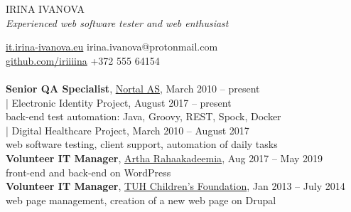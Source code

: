 \documentclass[a4paper, 12pt]{article}
\begin{document}
\begin{center}
  {\LARGE{IRINA IVANOVA}}\\
  \textit{Experienced web software tester and web enthusiast}
\end{center}
\href{https://it.irina-ivanova.eu}{it.irina-ivanova.eu}
\hspace{4.6cm}
irina.ivanova@protonmail.com\\
\href{https://github.com/iriiiina}{github.com/iriiiina}
\hspace{4.4cm}
+372 555 64154\\

\\
\textbf{Senior QA Specialist}, \href{https://nortal.com}{Nortal AS}, March 2010 \--- present\\
\indent | Electronic Identity Project, August 2017 \--- present\\
\indent \indent \indent back-end test automation: Java, Groovy, REST, Spock, Docker\\
\indent | Digital Healthcare Project, March 2010 \--- August 2017\\
\indent \indent \indent web software testing, client support, automation of daily tasks\\
\textbf{Volunteer IT Manager}, \href{https://rahaakadeemia.ee}{Artha Rahaakadeemia}, Aug 2017 \--- May 2019\\
\indent \indent \indent front-end and back-end on WordPress\\
\textbf{Volunteer IT Manager}, \href{https://www.lastefond.ee}{TUH Children's Foundation}, Jan 2013 \--- July 2014\\
\indent \indent \indent web page management, creation of a new web page on Drupal\\
\end{document}

